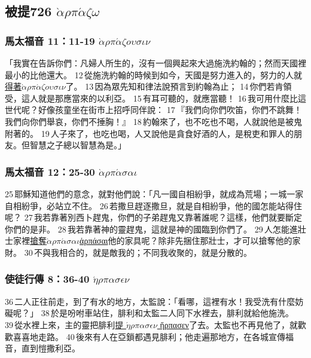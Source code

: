 \subsection{被提726 $\grave{\alpha}$$\rho$$\pi
$$\acute{\alpha}$$\zeta$$\omega$}

\subsubsection{馬太福音 11：11-19 $\grave{\alpha}$$\rho$$\pi$$\acute{\alpha}$$\zeta$$o$$\upsilon$$\sigma$$\iota$$\nu$}
「我實在告訴你們：凡婦人所生的，沒有一個興起來大過施洗約翰的；然而天國裡最小的比他還大。 12 從施洗約翰的時候到如今，天國是努力進入的，努力的人就\underline{得著$\grave{\alpha}$$\rho$$\pi$$\acute{\alpha}$$\zeta$$o$$\upsilon$$\sigma$$\iota$$\nu$}了。 13 因為眾先知和律法說預言到約翰為止； 14 你們若肯領受，這人就是那應當來的以利亞。 15 有耳可聽的，就應當聽！ 16 我可用什麼比這世代呢？好像孩童坐在街市上招呼同伴說： 17 『我們向你們吹笛，你們不跳舞！我們向你們舉哀，你們不捶胸！』 18 約翰來了，也不吃也不喝，人就說他是被鬼附著的。 19 人子來了，也吃也喝，人又說他是貪食好酒的人，是稅吏和罪人的朋友。但智慧之子總以智慧為是。」

\subsubsection{馬太福音 12：25-30 $\grave{\alpha}$$\rho$$\pi$$\acute{\alpha}$$\sigma$$\alpha$$\iota$}
25 耶穌知道他們的意念，就對他們說：「凡一國自相紛爭，就成為荒場；一城一家自相紛爭，必站立不住。 26 若撒旦趕逐撒旦，就是自相紛爭，他的國怎能站得住呢？ 27 我若靠著別西卜趕鬼，你們的子弟趕鬼又靠著誰呢？這樣，他們就要斷定你們的是非。 28 我若靠著神的靈趕鬼，這就是神的國臨到你們了。 29 人怎能進壯士家裡\underline{搶奪$\grave{\alpha}$$\rho$$\pi$$\acute{\alpha}$$\sigma$$\alpha$$\iota$ἁρπάσαι}他的家具呢？除非先捆住那壯士，才可以搶奪他的家財。 30 不與我相合的，就是敵我的；不同我收聚的，就是分散的。

\subsubsection{使徒行傳 8：36-40 $\acute{\eta}$$\rho$$\pi$$\alpha$$\sigma$$\epsilon$$\nu$}
36 二人正往前走，到了有水的地方，太監說：「看哪，這裡有水！我受洗有什麼妨礙呢？」 38 於是吩咐車站住，腓利和太監二人同下水裡去，腓利就給他施洗。 39 從水裡上來，主的靈把腓利\underline{提 $\acute{\eta}$$\rho$$\pi$$\alpha$$\sigma$$\epsilon$$\nu$ ἥρπασεν}了去。太監也不再見他了，就歡歡喜喜地走路。 40 後來有人在亞鎖都遇見腓利；他走遍那地方，在各城宣傳福音，直到愷撒利亞。

